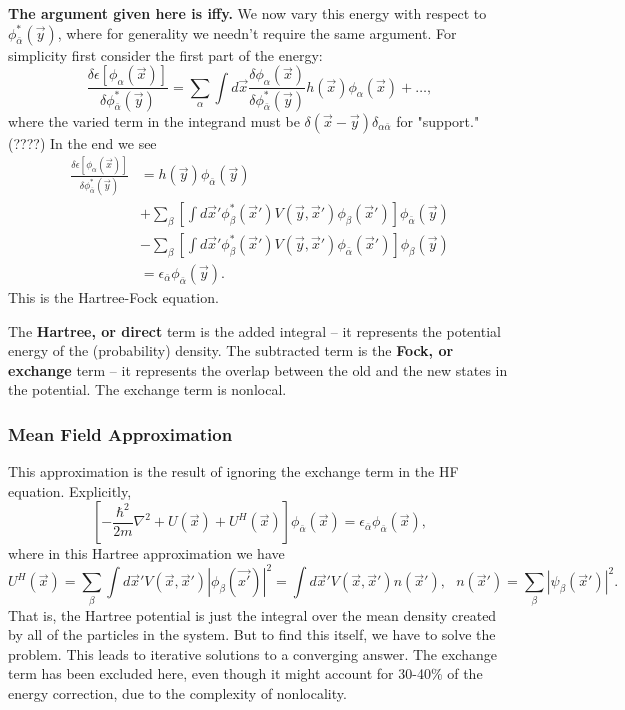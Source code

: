 \documentclass[fontsize=12pt]{scrartcl}
\begin{document}
 \textbf{The argument given here is iffy.}
 We now vary this energy with respect to $\phi_{\bar{\alpha}}^*(\vec{y})$, where for generality we needn't require the same argument. For simplicity first consider the first part of the energy: $$\frac{\delta \epsilon[\phi_\alpha(\vec{x})] }{\delta \phi_{\bar{\alpha}}^*(\vec{y})} = \sum_{\alpha} \int d\vec{x} \frac{\delta \phi_\alpha(\vec{x})}{\delta \phi_{\bar{\alpha}}^*(\vec{y})} h(\vec{x})\phi_\alpha(\vec{x}) + \dots,$$ where the varied term in the integrand must be $\delta(\vec{x}-\vec{y})\delta_{\alpha\bar{\alpha}}$ for "support." (????) In the end we see \begin{align*}
 \frac{\delta \epsilon[\phi_\alpha(\vec{x})] }{\delta \phi_{\bar{\alpha}}^*(\vec{y})} &= h(\vec{y})\phi_{\bar{\alpha}}(\vec{y})\\
 & + \sum_{\beta} \left[\int d\vec{x}' \phi_\beta^*(\vec{x}')V(\vec{y}, \vec{x}')\phi_\beta(\vec{x}')\right]\phi_{\bar{\alpha}}(\vec{y})\\
 &-\sum_{\beta} \left[\int d\vec{x}' \phi_\beta^*(\vec{x}')V(\vec{y},\vec{x}') \phi_{\bar{\alpha}}(\vec{x}')\right]\phi_\beta(\vec{y})\\
 &= \epsilon_{\bar{\alpha}}\phi_{\bar{\alpha}}(\vec{y}).
 \end{align*} This is the Hartree-Fock equation.
 
 The \textbf{Hartree, or direct} term is the added integral -- it represents the potential energy of the (probability) density. The subtracted term is the \textbf{Fock, or exchange} term -- it represents the overlap between the old and the new states in the potential. The exchange term is nonlocal.
 
 \subsubsection{Mean Field Approximation}
 
 This approximation is the result of ignoring the exchange term in the HF equation. Explicitly, $$\left[-\frac{\hbar^2}{2m} \nabla^2 + U(\vec{x})+U^H(\vec{x})\right]\phi_{\bar{\alpha}}(\vec{x})=\epsilon_{\bar{\alpha}}\phi_{\bar{\alpha}}(\vec{x}),$$ where in this Hartree approximation we have $$U^H(\vec{x})=\sum_{\beta} \int d\vec{x}' V(\vec{x}, \vec{x}') |\phi_\beta(\vec{x'})|^2 = \int d\vec{x}' V(\vec{x}, \vec{x}')n(\vec{x}'), \ \ \ n(\vec{x}')=\sum_{\beta} |\psi_\beta(\vec{x}')|^2.$$ That is, the Hartree potential is just the integral over the mean density created by all of the particles in the system. But to find this itself, we have to solve the problem. This leads to iterative solutions to a converging answer. The exchange term has been excluded here, even though it might account for 30-40\% of the energy correction, due to the complexity of nonlocality.
 
\end{document}
